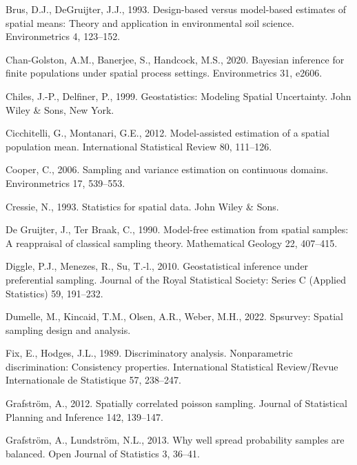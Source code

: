 \documentclass[]{elsarticle} %
\begin{document}
\leavevmode\hypertarget{ref-brus1993design}{}%
Brus, D.J., DeGruijter, J.J., 1993. Design-based versus model-based
estimates of spatial means: Theory and application in environmental soil
science. Environmetrics 4, 123--152.

\leavevmode\hypertarget{ref-chan2020bayesian}{}%
Chan-Golston, A.M., Banerjee, S., Handcock, M.S., 2020. Bayesian
inference for finite populations under spatial process settings.
Environmetrics 31, e2606.

\leavevmode\hypertarget{ref-chiles1999geostatistics}{}%
Chiles, J.-P., Delfiner, P., 1999. Geostatistics: Modeling Spatial
Uncertainty. John Wiley \& Sons, New York.

\leavevmode\hypertarget{ref-cicchitelli2012model}{}%
Cicchitelli, G., Montanari, G.E., 2012. Model-assisted estimation of a
spatial population mean. International Statistical Review 80, 111--126.

\leavevmode\hypertarget{ref-cooper2006sampling}{}%
Cooper, C., 2006. Sampling and variance estimation on continuous
domains. Environmetrics 17, 539--553.

\leavevmode\hypertarget{ref-cressie1993statistics}{}%
Cressie, N., 1993. Statistics for spatial data. John Wiley \& Sons.

\leavevmode\hypertarget{ref-de1990model}{}%
De Gruijter, J., Ter Braak, C., 1990. Model-free estimation from spatial
samples: A reappraisal of classical sampling theory. Mathematical
Geology 22, 407--415.

\leavevmode\hypertarget{ref-diggle2010geostatistical}{}%
Diggle, P.J., Menezes, R., Su, T.-l., 2010. Geostatistical inference
under preferential sampling. Journal of the Royal Statistical Society:
Series C (Applied Statistics) 59, 191--232.

\leavevmode\hypertarget{ref-dumelle2022spsurvey}{}%
Dumelle, M., Kincaid, T.M., Olsen, A.R., Weber, M.H., 2022. Spsurvey:
Spatial sampling design and analysis.

\leavevmode\hypertarget{ref-fix1989discriminatory}{}%
Fix, E., Hodges, J.L., 1989. Discriminatory analysis. Nonparametric
discrimination: Consistency properties. International Statistical
Review/Revue Internationale de Statistique 57, 238--247.

\leavevmode\hypertarget{ref-grafstrom2012spatiallypoisson}{}%
Grafström, A., 2012. Spatially correlated poisson sampling. Journal of
Statistical Planning and Inference 142, 139--147.

\leavevmode\hypertarget{ref-grafstrom2013well}{}%
Grafström, A., Lundström, N.L., 2013. Why well spread probability
samples are balanced. Open Journal of Statistics 3, 36--41.
\end{document}
